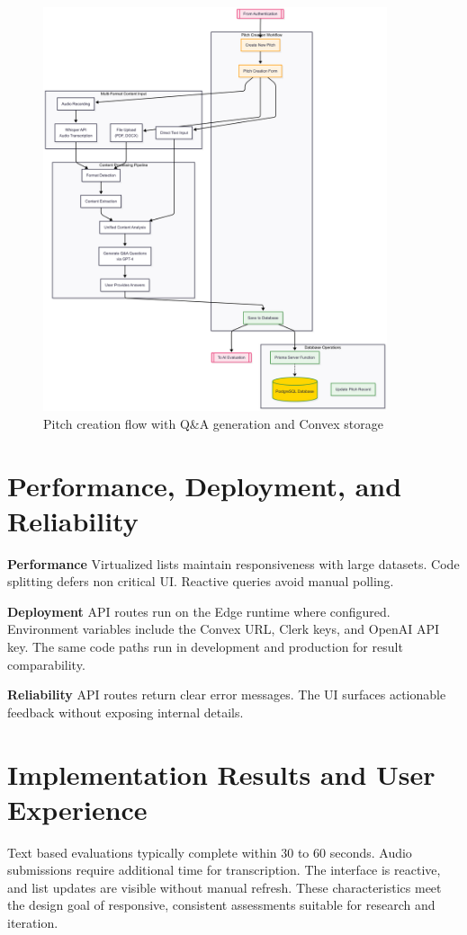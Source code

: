 \begin{figure}[H]
  \centering
  \includegraphics[width=0.9\textwidth]{img/user-flow-pitch}
  \caption{Pitch creation flow with Q\&A generation and Convex storage}
  \label{fig:user-flow-pitch}
\end{figure}

\section{Performance, Deployment, and Reliability}
\textbf{Performance} Virtualized lists maintain responsiveness with large datasets. Code splitting defers non critical UI. Reactive queries avoid manual polling.

\textbf{Deployment} API routes run on the Edge runtime where configured. Environment variables include the Convex URL, Clerk keys, and OpenAI API key. The same code paths run in development and production for result comparability.

\textbf{Reliability} API routes return clear error messages. The UI surfaces actionable feedback without exposing internal details.

\section{Implementation Results and User Experience}\label{sec:results}
Text based evaluations typically complete within 30 to 60 seconds. Audio submissions require additional time for transcription. The interface is reactive, and list updates are visible without manual refresh. These characteristics meet the design goal of responsive, consistent assessments suitable for research and iteration.
